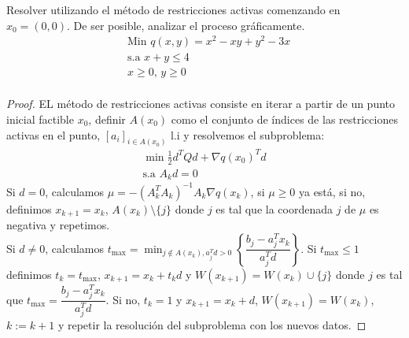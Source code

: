 \documentclass{article}
\newenvironment{theorem}[2][Ejercicio]{\begin{trivlist}
\item[\hskip \labelsep {\bfseries #1}\hskip \labelsep {\bfseries #2.}]}{\end{trivlist}}
\begin{document}
\begin{theorem}{4}
    Resolver utilizando el método de restricciones activas comenzando en \( x_0 = (0, 0) \). De ser posible, analizar el proceso gráficamente.
    \begin{align*}
         & \text{Min } q(x, y)=  x^2 - xy + y^2 - 3x \\
         & \text{s.a } x + y \leq 4                  \\
         & x \geq 0, \, y \geq 0                     \\
    \end{align*}
\end{theorem}

\begin{proof}
    EL método de restricciones activas consiste en iterar a partir de un punto inicial factible \( x_0 \), definir \( A(x_0) \) como el conjunto de índices de las restricciones activas en el punto, \( {[a_i]}_{i \in A(x_0)} \) l.i y resolvemos el subproblema:\begin{align*}
        \min \frac{1}{2} d^T Q d + {\nabla q(x_0)}^T d \\
        \text{s.a } A_k d = 0
    \end{align*}
    Si \( d = 0 \), calculamos \( \mu = -{(A_k^T A_k)}^{-1} A_k \nabla q(x_k) \), si \( \mu \geq 0 \) ya está, si no, definimos \( x_{k+1} = x_k \), \( A(x_k) \setminus \{ j \} \) donde \( j \)  es tal que la coordenada \( j \) de \( \mu \) es negativa y repetimos.\\
    Si \( d \neq 0 \), calculamos \( t_{\max} = \min_{j \notin A(x_k), a_j^T d > 0} \left \{ \dfrac{b_j - a_j^T x_k}{a_j^T d} \right \} \). Si \( t_{\max} \leq 1 \) definimos \( t_k = t_{\max} \), \( x_{k+1} = x_k + t_k d \) y \( W(x_{k+1}) = W(x_k) \cup \{ j \} \) donde \( j \) es tal que \( t_{\max} = \dfrac{b_j - a_j^T x_k}{a_j^T d} \). Si no, \( t_k = 1 \) y \( x_{k+1} = x_k + d \), \( W(x_{k+1}) = W(x_k) \), \( k := k+1\) y repetir la resolución del subproblema con los nuevos datos.


\end{proof}
\end{document}
